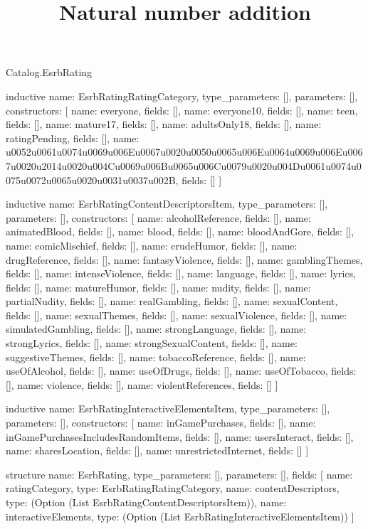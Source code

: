 \begin{lexlean}{Catalog.EsrbRating}
\title{Natural number addition}
\begin{semanticmodule}
inductive{
  name: EsrbRatingRatingCategory,
  type_parameters: [],
  parameters: [],
  constructors: [
    {name: everyone, fields: []},
    {name: everyone10, fields: []},
    {name: teen, fields: []},
    {name: mature17, fields: []},
    {name: adultsOnly18, fields: []},
    {name: ratingPending, fields: []},
    {name: u0052u0061u0074u0069u006Eu0067u0020u0050u0065u006Eu0064u0069u006Eu0067u0020u2014u0020u004Cu0069u006Bu0065u006Cu0079u0020u004Du0061u0074u0075u0072u0065u0020u0031u0037u002B, fields: []}
  ]
}

inductive{
  name: EsrbRatingContentDescriptorsItem,
  type_parameters: [],
  parameters: [],
  constructors: [
    {name: alcoholReference, fields: []},
    {name: animatedBlood, fields: []},
    {name: blood, fields: []},
    {name: bloodAndGore, fields: []},
    {name: comicMischief, fields: []},
    {name: crudeHumor, fields: []},
    {name: drugReference, fields: []},
    {name: fantasyViolence, fields: []},
    {name: gamblingThemes, fields: []},
    {name: intenseViolence, fields: []},
    {name: language, fields: []},
    {name: lyrics, fields: []},
    {name: matureHumor, fields: []},
    {name: nudity, fields: []},
    {name: partialNudity, fields: []},
    {name: realGambling, fields: []},
    {name: sexualContent, fields: []},
    {name: sexualThemes, fields: []},
    {name: sexualViolence, fields: []},
    {name: simulatedGambling, fields: []},
    {name: strongLanguage, fields: []},
    {name: strongLyrics, fields: []},
    {name: strongSexualContent, fields: []},
    {name: suggestiveThemes, fields: []},
    {name: tobaccoReference, fields: []},
    {name: useOfAlcohol, fields: []},
    {name: useOfDrugs, fields: []},
    {name: useOfTobacco, fields: []},
    {name: violence, fields: []},
    {name: violentReferences, fields: []}
  ]
}

inductive{
  name: EsrbRatingInteractiveElementsItem,
  type_parameters: [],
  parameters: [],
  constructors: [
    {name: inGamePurchases, fields: []},
    {name: inGamePurchasesIncludesRandomItems, fields: []},
    {name: usersInteract, fields: []},
    {name: sharesLocation, fields: []},
    {name: unrestrictedInternet, fields: []}
  ]
}

structure{
  name: EsrbRating,
  type_parameters: [],
  parameters: [],
  fields: [
    {name: ratingCategory, type: EsrbRatingRatingCategory},
    {name: contentDescriptors, type: (Option (List EsrbRatingContentDescriptorsItem))},
    {name: interactiveElements, type: (Option (List EsrbRatingInteractiveElementsItem))}
  ]
}
\end{semanticmodule}
\end{lexlean}
